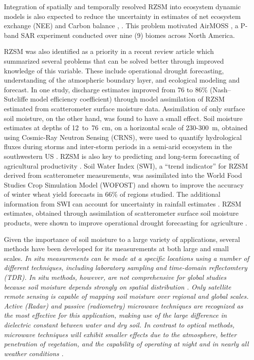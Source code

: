 \documentclass[draftcls,onecolumn]{IEEEtran}  %
\begin{document}
Integration of  spatially and temporally resolved RZSM into ecosystem dynamic models is also expected to reduce the uncertainty in estimates of net ecosystem exchange (NEE) and Carbon balance \cite{Briggs2008}, \cite{Krishnan2006}. 
This problem motivated  AirMOSS \cite{Tabatabaeenejad2015}, a P-band SAR experiment conducted over nine (9) biomes across North America. 


RZSM was also identified  as a priority in a recent review article \cite{Ochsner2013} which summarized several problems that can be solved better through improved  
knowledge of this variable. 
These include operational drought forecasting, understanding of the atmospheric boundary layer, and ecological modeling and forecast.
In one study,  discharge estimates  improved from 76 to 86\% (Nash–Sutcliffe model efficiency coefficient) through model assimilation of RZSM estimated from scatterometer surface moisture data.  Assimilation of only surface soil moisture, on the other hand, was found to have  a small effect.
Soil moisture estimates at depths of 12~to~76~cm, on a horizontal scale of 230-300~m, obtained using Cosmic-Ray Neutron Sensing (CRNS),
were used to quantify hydrological fluxes during storms and inter-storm periods  in a  semi-arid ecosystem in the southwestern US \cite{Schreiner-McGraw2016}.
 RZSM is also key to predicting and long-term forecasting of agricultural productivity  \cite{National2016}. 
Soil Water Index (SWI), a  ``trend indicator'' for RZSM derived from scatterometer measurements,
was assimilated into the World Food Studies Crop Simulation Model (WOFOST) and 
shown to improve the accuracy of winter wheat yield forecasts in 66\% of regions studied.
The additional information from SWI can account for uncertainty in rainfall estimates \cite{Wit2007}.  
RZSM estimates, obtained through assimilation of scatterometer surface soil moisture products, were shown to improve operational drought forecasting for agriculture  \cite{Bolten2010a}.

Given the importance of soil moisture to a large variety of applications, several methods have been developed for its measurements at both large and small scales. 
 \it In situ \rm  measurements can be made at a specific locations using a number of different techniques, including laboratory sampling and time-domain reflectomtery (TDR). 
\it In situ \rm methods, however, are not comprehensive for global studies because soil moisture  depends strongly on spatial distribution \cite{Wang:2009}. 
Only satellite remote sensing is capable of mapping soil moisture over regional and global scales.  
Active (Radar) and passive (radiometry) microwave techniques are recognized as the most effective for this application,   
making use of the large difference in dielectric constant  between water and dry soil. 
In contrast to optical methods, microwave techniques will exhibit smaller effects due to the atmosphere, better penetration of vegetation, and the capability of operating at night and in nearly all weather conditions \cite{Kerr2007a}. 
\end{document}
